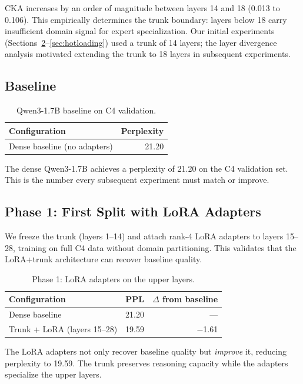 \documentclass{article}
\begin{document}
CKA increases by an order of magnitude between layers 14 and 18 (0.013 to
0.106). This empirically determines the trunk boundary: layers below 18 carry
insufficient domain signal for expert specialization. Our initial experiments
(Sections~\ref{tab:phase1}--\ref{sec:hotloading}) used a trunk of 14 layers;
the layer divergence analysis motivated extending the trunk to 18 layers in
subsequent experiments.

\subsection{Baseline}

\begin{table}[h]
\centering
\caption{Qwen3-1.7B baseline on C4 validation.}
\label{tab:baseline}
\begin{tabular}{@{}lr@{}}
\toprule
Configuration & Perplexity \\
\midrule
Dense baseline (no adapters) & 21.20 \\
\bottomrule
\end{tabular}
\end{table}

The dense Qwen3-1.7B achieves a perplexity of 21.20 on the C4 validation set.
This is the number every subsequent experiment must match or improve.

\subsection{Phase 1: First Split with LoRA Adapters}

We freeze the trunk (layers 1--14) and attach rank-4 LoRA adapters to layers
15--28, training on full C4 data without domain partitioning. This validates
that the LoRA+trunk architecture can recover baseline quality.

\begin{table}[h]
\centering
\caption{Phase 1: LoRA adapters on the upper layers.}
\label{tab:phase1}
\begin{tabular}{@{}lrr@{}}
\toprule
Configuration & PPL & $\Delta$ from baseline \\
\midrule
Dense baseline & 21.20 & --- \\
Trunk + LoRA (layers 15--28) & 19.59 & $-$1.61 \\
\bottomrule
\end{tabular}
\end{table}

The LoRA adapters not only recover baseline quality but \emph{improve} it,
reducing perplexity to 19.59. The trunk preserves reasoning capacity while the
adapters specialize the upper layers.
\end{document}
